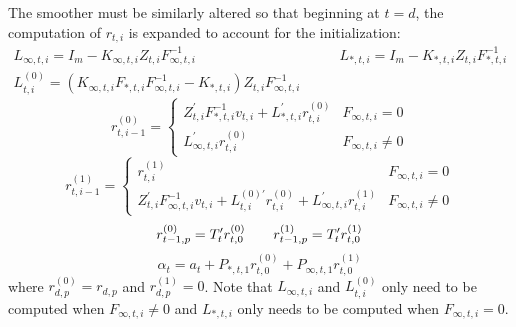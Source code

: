 \documentclass[12pt]{article}
\begin{document}
	The smoother must be similarly altered so that beginning at $t = d$, the computation of $r_{t,i}$ is expanded to account for the initialization:
	\begin{align*}
	L_{\infty,t,i} = I_m - K_{\infty,t,i} Z_{t,i} F_{\infty,t,i}^{-1} &\qquad
	L_{*,t,i} = I_m - K_{*,t,i} Z_{t,i} F_{*,t,i}^{-1} \\
	L_{t,i}^{(0)} = \left(K_{\infty,t,i} F_{*,t,i} F_{\infty,t,i}^{-1} - K_{*,t,i} \right) Z_{t,i} F_{\infty,t,i}^{-1} &
	\end{align*}
	\begin{equation*}
	r_{t,i-1}^{(0)} = \begin{cases} 
	   Z_{t,i}^\prime F_{*,t,i}^{-1} v_{t,i} + L_{*,t,i}^\prime r_{t,i}^{(0)} & F_{\infty,t,i} = 0 \\
	   L_{\infty,t,i}^\prime r_{t,i}^{(0)} & F_{\infty,t,i} \neq 0	   
	\end{cases} 
	\end{equation*}
	\begin{equation*}
	r_{t,i-1}^{(1)} = \begin{cases} 
	   r_{t,i}^{(1)} & F_{\infty,t,i} = 0 \\
	   Z_{t,i}^\prime F_{\infty,t,i}^{-1} v_{t,i} + L_{t,i}^{(0)\prime} r_{t,i}^{(0)} + L_{\infty,t,i}^\prime r_{t,i}^{(1)} & F_{\infty,t,i} \neq 0	   
	\end{cases} 
	\end{equation*}
	\begin{equation*}
	r_{t-1,p}^{(0)} = T_t^\prime r_{t,0}^{(0)} \qquad r_{t-1,p}^{(1)} = T_t^\prime r_{t,0}^{(1)}  \\
	\end{equation*}
	\begin{equation*}
	\hat{\alpha}_t = a_t + P_{*,t,1} r_{t,0}^{(0)} + P_{\infty,t,1} r_{t,0}^{(1)}
	\end{equation*}
	where $r_{d,p}^{(0)} = r_{d,p}$ and $r_{d,p}^{(1)} = 0$. Note that $L_{\infty,t,i}$ and $L_{t,i}^{(0)}$ only need to be computed when $F_{\infty,t,i} \neq 0$ and $L_{*,t,i}$ only needs to be computed when $F_{\infty,t,i} = 0$. 
\end{document}
